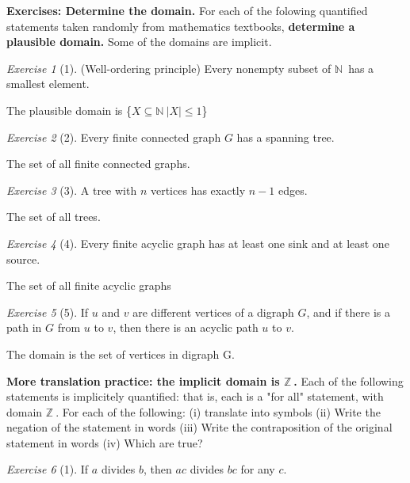 \documentclass[12pt]{amsart}
\theoremstyle{remark}
\newtheorem*{exercise}{Exercise}%
\newcommand{\NN}{\ensuremath{\mathbb N}}
\newcommand{\ZZ}{\ensuremath{\mathbb Z}}
\theoremstyle{mycomment}
\begin{document}
\thispagestyle{fancy}

\textbf{Exercises: Determine the domain.} For each of the folowing quantified statements taken randomly from mathematics textbooks, \textbf{ determine a plausible domain.} Some of the domains are implicit.

\begin{exercise}[1] (Well-ordering principle) Every nonempty subset of \NN\ has a smallest element. \newline 

	The plausible domain is \{$X \subseteq \NN\: |X| \leq 1$\}

\end{exercise}

\begin{exercise}[2] Every finite connected graph $G$ has a spanning tree. \newline

	The set of all finite connected graphs.
\end{exercise}
\begin{exercise}[3] A tree with $n$ vertices has exactly $n - 1$ edges. \newline
	
	The set of all trees.
\end{exercise}

\begin{exercise}[4] Every finite acyclic graph has at least one sink and at least one source. \newline


	The set of all finite acyclic graphs
\end{exercise}

\begin{exercise}[5] If $u$ and $v$ are different vertices of a digraph $G$, and if there is a path in $G$ from $u$ to $v$, then there is an acyclic path $u$ to $v$. \newline

	The domain is the set of vertices in digraph G.
\end{exercise}

\textbf{More translation practice: the implicit domain is $\ZZ\ $. } Each of the following statements is implicitely quantified: that is, each is a "for all" statement, with domain $ \ZZ\ .$ For each of the following: \newline
(i) translate into symbols \newline
(ii) Write the negation of the statement in words \newline
(iii) Write the contraposition of the original statement in words \newline
(iv) Which are true? \newline

\begin{exercise}[1] If $a$ divides $b$, then $ac$ divides $bc$ for any $c$. \newline
\end{exercise}



 
\end{document}
